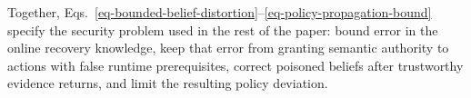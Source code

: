 Together, Eqs.~\ref{eq-bounded-belief-distortion}--\ref{eq-policy-propagation-bound} specify the security problem used in the rest of the paper: bound error in the online recovery knowledge, keep that error from granting semantic authority to actions with false runtime prerequisites, correct poisoned beliefs after trustworthy evidence returns, and limit the resulting policy deviation.
